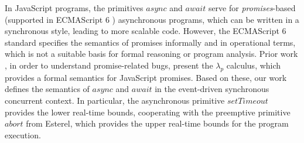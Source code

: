 \documentclass[acmsmall,review,anonymous]{acmart}\settopmatter{printfolios=true,printccs=false,printacmref=false}
\newcommand{\code}[1]{{\tt{\ensuremath{\m{#1}}}}}
\newcommand{\m}{\mathit}
\begin{document}
In JavaScript programs, the primitives \code{async} and \code{await} serve for \emph{promises}-based (supported in ECMAScript 6 \cite{ecma1999262}) asynchronous programs, which can be written in a synchronous style, leading to more scalable code. 
However, the ECMAScript 6 standard specifies the semantics of promises informally and in operational terms, which is not a suitable basis for formal reasoning or program analysis. Prior work \cite{madsen2017model,alimadadi2018finding}, in order to understand promise-related bugs, present the \code{\lambda_p} calculus, which provides a formal semantics for JavaScript promises. Based on these, our work defines the semantics of \code{async} and \code{await} in the event-driven synchronous concurrent context. In particular, the asynchronous primitive \code{setTimeout} provides the lower real-time bounds, cooperating with the preemptive primitive \code{abort} from Esterel,  which provides the upper real-time bounds for the program execution. 







\end{document}
